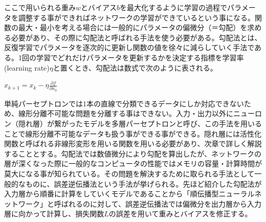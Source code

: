 \documentclass{article}
\begin{document}
ここで用いられる重み\begin{math}w\end{math}とバイアス\begin{math}b\end{math}を最大化するように学習の過程でパラメータを調整する事ができればネットワークの学習ができているという事になる。関数の最大・最小を考える場合には一般的にパラメータの偏微分（＝勾配）を求める必要があり、その際に勾配法と呼ばれる手法を使う必要がある。勾配法とは、反復学習でパラメータを逐次的に更新し関数の値を徐々に減らしていく手法である。1回の学習でどれだけパラメータを更新するかを決定する指標を学習率(learning rate)\begin{math}\eta\end{math}と置くとき、勾配法は数式で次のように表される。

\begin{center}
\begin{math}
x_{k+1} = x_k - \eta\frac{\partial f}{\partial x_0}
\end{math}
\end{center}

単純パーセプトロンでは1本の直線で分類できるデータにしか対応できないため、線形分離不可能な問題を分離する事はできない。入力・出力以外にニューロン（隠れ層）が繋がったモデルを多層パーセプトロンと呼び、この手法を用いることで線形分離不可能なデータも扱う事ができる事ができる。隠れ層には活性化関数と呼ばれる非線形変形を用いる関数を用いる必要があり、次章で詳しく解説することとする。勾配法では数値微分により勾配を算出したが、ネットワークの層が深くなった際に一般的なコンピュータの性能ではメモリの容量・計算時間が莫大になる事が知られている。その問題を解決するために取られる手法として一般的なものに、誤差逆伝播法という手法が挙げられる。先ほど紹介した勾配法が入力層から順番に計算をしていくモデルであることから「順伝播型ニューラルネットワーク」と呼ばれるのに対して、誤差逆伝播法では偏微分を出力層から入力層に向かって計算し、損失関数\begin{math}L\end{math}の誤差を用いて重みとバイアスを修正する。


\end{document}
